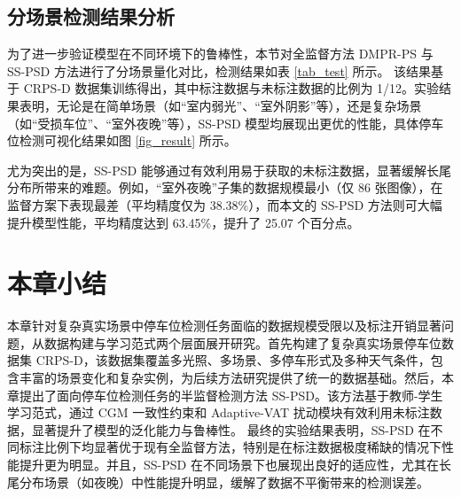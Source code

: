 \subsection{分场景检测结果分析}

为了进一步验证模型在不同环境下的鲁棒性，本节对全监督方法 DMPR-PS \cite{huang2019dmpr} 与 SS-PSD 方法进行了分场景量化对比，检测结果如表 \ref{tab_test} 所示。
该结果基于 CRPS-D 数据集训练得出，其中标注数据与未标注数据的比例为 1/12。实验结果表明，无论是在简单场景（如“室内弱光”、“室外阴影”等），还是复杂场景（如“受损车位”、“室外夜晚”等），SS-PSD 模型均展现出更优的性能，具体停车位检测可视化结果如图 \ref{fig_result} 所示。

尤为突出的是，SS-PSD 能够通过有效利用易于获取的未标注数据，显著缓解长尾分布所带来的难题。例如，“室外夜晚”子集的数据规模最小（仅 86 张图像），在监督方案下表现最差（平均精度仅为 38.38\%），而本文的 SS-PSD 方法则可大幅提升模型性能，平均精度达到 63.45\%，提升了 25.07 个百分点。



\section{本章小结}

本章针对复杂真实场景中停车位检测任务面临的数据规模受限以及标注开销显著问题，从数据构建与学习范式两个层面展开研究。首先构建了复杂真实场景停车位数据集 CRPS-D，该数据集覆盖多光照、多场景、多停车形式及多种天气条件，包含丰富的场景变化和复杂实例，为后续方法研究提供了统一的数据基础。然后，本章提出了面向停车位检测任务的半监督检测方法 SS-PSD。该方法基于教师-学生学习范式，通过 CGM 一致性约束和 Adaptive-VAT 扰动模块有效利用未标注数据，显著提升了模型的泛化能力与鲁棒性。
最终的实验结果表明，SS-PSD 在不同标注比例下均显著优于现有全监督方法，特别是在标注数据极度稀缺的情况下性能提升更为明显。并且，SS-PSD 在不同场景下也展现出良好的适应性，尤其在长尾分布场景（如夜晚）中性能提升明显，缓解了数据不平衡带来的检测误差。


